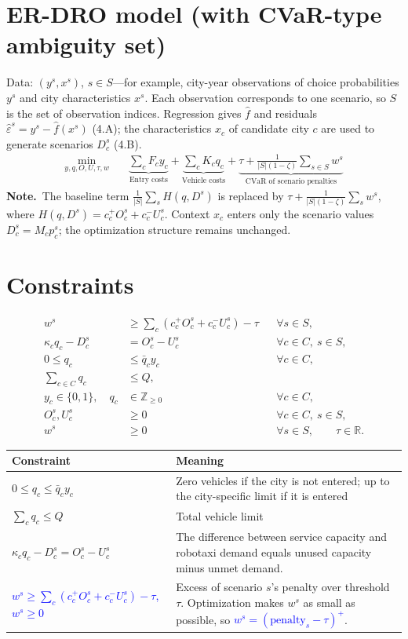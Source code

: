 \documentclass[10pt,a4paper]{article}
\newcommand{\note}{\textbf{Note.}\ }
\begin{document}
\section{ER-DRO model (with CVaR-type ambiguity set)}
Data: $(y^s,x^s)$, $s\in S$---for example, city-year observations of choice probabilities $y^s$ and city characteristics $x^s$. Each observation corresponds to one scenario, so $S$ is the set of observation indices. Regression gives $\hat f$ and residuals $\hat\varepsilon^s=y^s-\hat f(x^s)$ (4.A); the characteristics $x_c$ of candidate city $c$ are used to generate scenarios $D_c^s$ (4.B).
{\small
\[
\boxed{\begin{aligned}
\min_{y,q,O,U,\tau,w}\quad
&\underbrace{\sum_cF_cy_c}_{\text{Entry costs}}+
\underbrace{\sum_cK_cq_c}_{\text{Vehicle costs}}+
\underbrace{\tau+\frac{1}{|S|(1-\zeta)}\sum_{s\in S}w^s}_{\text{CVaR of scenario penalties}}
\end{aligned}}
\]}
\note The baseline term $\frac1{|S|}\sum_s H(q,D^s)$ is replaced by $\tau+\frac1{|S|(1-\zeta)}\sum_sw^s$, where $H(q,D^s)=c_c^+O_c^s+c_c^-U_c^s$. Context $x_c$ enters only the scenario values $D_c^s=M_cp_c^s$; the optimization structure remains unchanged.

\section{Constraints}
\[
\boxed{\begin{aligned}
w^s&\ge\sum_c\left(c_c^+O_c^s+c_c^-U_c^s\right)-\tau &&\forall s\in S,\\
\kappa_cq_c-D_c^s&=O_c^s-U_c^s &&\forall c\in C,\ s\in S,\\
0\le q_c&\le\bar q_cy_c &&\forall c\in C,\\
\sum_{c\in C}q_c&\le Q,\\
y_c\in\{0,1\},\quad q_c&\in\mathbb Z_{\ge0} &&\forall c\in C,\\
O_c^s,U_c^s&\ge0 &&\forall c\in C,\ s\in S,\\
w^s&\ge0 &&\forall s\in S,\qquad\tau\in\mathbb R.
\end{aligned}}
\]
{\footnotesize
\begin{longtable}{@{}L{0.40\textwidth}L{0.56\textwidth}@{}}
\toprule Constraint & Meaning\\\midrule\endhead\bottomrule\endlastfoot
$0\le q_c\le\bar q_cy_c$ & Zero vehicles if the city is not entered; up to the city-specific limit if it is entered\\
$\sum_cq_c\le Q$ & Total vehicle limit\\
$\kappa_cq_c-D_c^s=O_c^s-U_c^s$ & The difference between service capacity and robotaxi demand equals unused capacity minus unmet demand.\\
\textcolor{blue}{$w^s\ge\sum_c(c_c^+O_c^s+c_c^-U_c^s)-\tau$, $w^s\ge0$} & Excess of scenario $s$'s penalty over threshold $\tau$. Optimization makes $w^s$ as small as possible, so \textcolor{blue}{$w^s=(\text{penalty}_s-\tau)^+$}.\\
\end{longtable}}
\end{document}
